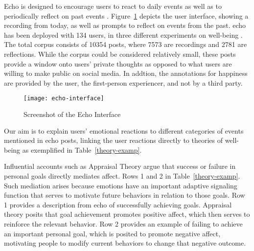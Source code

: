 \documentclass[11pt,letterpaper]{article}
\begin{document}
{\sc Echo} is designed to encourage users to react to daily events as
well as to periodically reflect on past events
\cite{Isaacsetal13}. Figure~\ref{echo-interface-fig} depicts the user
interface, showing a {\sc recording} from today, as well as prompts to
reflect on events from the past.  {\sc echo} has been deployed with
134 users, in three different experiments on well-being
\cite{Konradetal16,Konradetal-TOCHI16}.  The total corpus consists of
10354 posts, where 7573 are {\sc recordings} and 2781 are {\sc
  reflections}. While the corpus could be considered relatively small,
these posts provide a window onto users' private thoughts as opposed
to what users are willing to make public on social media. In addtion,
the annotations for happiness are provided by the user, the
first-person experiencer, and not by a third party.

\begin{figure}[ht!]
\centering
\texttt{[image: echo-interface]}
\caption{Screenshot of the Echo Interface \label{echo-interface-fig}}
\end{figure}



Our aim is to explain users' emotional reactions to different
categories of events mentioned in {\sc echo} posts, linking the
user reactions directly to theories of well-being as exemplified in
Table~\ref{theory-examp}. 

Influential accounts such as Appraisal Theory
\cite{scherer2001appraisal,SchererWallbott86,Ortonyetal90} argue that
success or failure in personal goals directly mediates affect.  Rows 1
and 2 in Table~\ref{theory-examp}.  Such mediation arises because
emotions have an important adaptive signaling function that serves to
motivate future behaviors in relation to those goals.  Row 1 provides
a description from {\sc echo} of successfully achieving
goals. Appraisal theory posits that goal achievement promotes positive
affect, which then serves to reinforce the relevant behavior.
Row 2 provides an example of failing to achieve an important
personal goal, which is posited to promote
negative affect, motivating people to modify current behaviors to
change that negative outcome.
\end{document}
